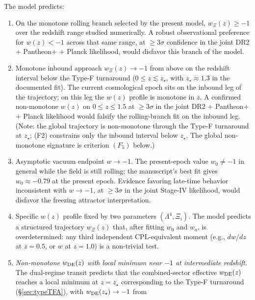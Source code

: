 \documentclass[11pt,reqno]{amsart}
\theoremstyle{plain}
\theoremstyle{definition}
\theoremstyle{remark}
\begin{document}
The model predicts:
\begin{enumerate}
  \item[(F1)] On the monotone rolling branch selected by the present
        model, $w_\Xi(z) \geq -1$ over the redshift range studied
        numerically. A robust observational preference for $w(z) < -1$
        across that same range, at $\geq 3\sigma$ confidence in the joint
        DR2 + Pantheon+ + Planck likelihood, would disfavor this branch
        of the model.
  \item[(F2)] Monotone inbound approach $w_\Xi(z) \to -1$ from above
        on the redshift interval below the Type-F turnaround
        ($0 \leq z \lesssim z_\star$, with $z_\star \approx 1.3$ in the
        documented fit). The current cosmological epoch sits on the
        inbound leg of the trajectory; on this leg the
        $w(z)$ profile is monotone in $z$. A confirmed non-monotone
        $w(z)$ on $0 \leq z \leq 1.5$ at $\geq 3\sigma$ in the joint
        DR2 + Pantheon+ + Planck likelihood would falsify the
        rolling-branch fit on the inbound leg. (Note: the global
        trajectory is non-monotone through the Type-F turnaround at
        $z_\star$; (F2) constrains only the inbound interval below
        $z_\star$. The global non-monotone signature is criterion
        $(F_5)$ below.)
  \item[(F3)] Asymptotic vacuum endpoint $w \to -1$. The present-epoch
        value $w_0 \neq -1$ in general while the field is still rolling;
        the manuscript's best fit gives $w_0 \approx -0.79$ at the present
        epoch. Evidence favoring late-time behavior inconsistent with
        $w \to -1$, at $\geq 3\sigma$ in the joint Stage-IV likelihood,
        would disfavor the freezing attractor interpretation.
  \item[(F4)] Specific $w(z)$ profile fixed by two parameters
        $(\Lambda^{4}, \Xi_i)$. The model predicts a structured
        trajectory $w_\Xi(z)$ that, after fitting $w_0$ and $w_a$, is
        overdetermined: any third independent CPL-equivalent moment
        (e.g., $dw/dz$ at $z=0.5$, or $w$ at $z=1.0$) is a non-trivial
        test.
  \item[(F5)] \emph{Non-monotone $w_{\rm DE}(z)$ with local minimum
        near $-1$ at intermediate redshift.}
        The dual-regime transit predicts that the combined-sector
        effective $w_{\rm DE}(z)$ reaches a local minimum at
        $z = z_\star$ corresponding to the Type-F turnaround
        (\S\ref{sec:typeTFA}), with $w_{\rm DE}(z_\star) \to -1$ from

\end{enumerate}
\end{document}
